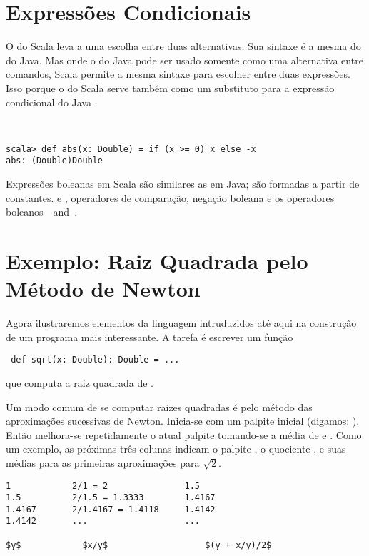 \section{Express\~{o}es Condicionais}
O  do Scala leva a uma escolha entre duas alternativas. Sua
sintaxe \'{e} a mesma do  do Java. Mas onde o  do 
Java pode ser usado somente como uma alternativa entre comandos, Scala 
permite a mesma sintaxe para escolher entre duas express\~{o}es. Isso porque o
 do Scala serve tamb\'{e}m como um substituto para a express\~{a}o 
condicional do Java .      

\example\
\begin{lstlisting}
scala> def abs(x: Double) = if (x >= 0) x else -x
abs: (Double)Double
\end{lstlisting}
Express\~{o}es boleanas em Scala s\~{a}o similares as em Java; s\~{a}o formadas
a partir de constantes.  
 e
, operadores de compara\c{c}\~{a}o, nega\c{c}\~{a}o boleana \code{!} e os 
operadores boleanos  $\,$\code{&&}$\,$ and $\,$\code{||}. 

\section{\label{sec:sqrt}Exemplo: Raiz Quadrada pelo M\'{e}todo de Newton}
Agora ilustraremos elementos da linguagem intruduzidos at\'{e} aqui na
constru\c{c}\~{a}o de um programa mais interessante. A tarefa \'{e} escrever um fun\c{c}\~{a}o  
 \begin{lstlisting}
 def sqrt(x: Double): Double = ...
 \end{lstlisting}
que computa a raiz quadrada de . 

Um modo comum de se computar raizes quadradas \'{e} pelo m\'{e}todo das aproxima\c{c}\~{o}es
sucessivas de Newton. Inicia-se com um palpite inicial  (digamos:
\code{y = 1}). Ent\~{a}o melhora-se repetidamente o atual palpite  
tomando-se a m\'{e}dia de  e . Como um exemplo, as pr\'{o}ximas
tr\^{e}s colunas indicam o palpite \code{y}, o quociente \code{x/y}, e suas
m\'{e}dias para as primeiras aproxima\c{c}\~{o}es para 
$\sqrt 2$.       

\begin{lstlisting}
1            2/1 = 2               1.5
1.5          2/1.5 = 1.3333        1.4167
1.4167       2/1.4167 = 1.4118     1.4142
1.4142       ...                   ...

$y$            $x/y$                   $(y + x/y)/2$
\end{lstlisting}

